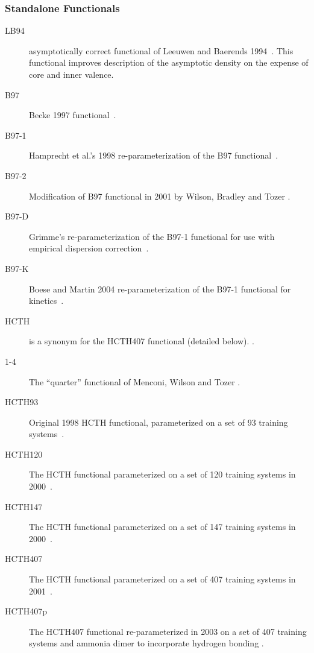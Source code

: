 \subsubsection{Standalone Functionals}
\providecommand\onefn[1]{#1}
\begin{description}

\item[LB94] asymptotically correct functional of Leeuwen and
  Baerends 1994~\cite{dft:lb94}. This functional improves description of the
  asymptotic density on the expense of core and inner valence.

\item[B97] Becke 1997 functional~\cite{dft:b97}.

\item[B97-1] Hamprecht et al.'s 1998 re-parameterization of the 
  B97 functional~\cite{dft:b97-1}.

\item[B97-2] Modification of B97 functional in 2001 by Wilson, Bradley and Tozer 
  \cite{dft:b97-2}.

\item[B97-D] Grimme's re-parameterization of the B97-1 functional for use with 
empirical dispersion correction~\cite{dft:b97-d}.

\item[B97-K] Boese and Martin 2004 re-parameterization of the 
  B97-1 functional for kinetics~\cite{dft:b97-1}.

\item[HCTH] is a synonym for the HCTH407 functional (detailed below).
  \cite{dft:hcth407}.

\item[1-4] The ``quarter'' functional of Menconi, Wilson and Tozer 
  \cite{dft:14}.

\item[HCTH93] Original 1998 HCTH functional, parameterized on a set of 
  93 training systems~\cite{dft:hcth93}.

\item[HCTH120] The HCTH functional parameterized on a set of 120 training systems 
  in 2000~\cite{dft:hcth120}.

\item[HCTH147] The HCTH functional parameterized on a set of 147 training systems 
  in 2000~\cite{dft:hcth120}.

\item[HCTH407] The HCTH functional parameterized on a set of 407 training systems 
  in 2001~\cite{dft:hcth407}.

\item[HCTH407p] The HCTH407 functional re-parameterized in 2003 on a set of 407 
  training systems and ammonia dimer to incorporate hydrogen bonding 
  \cite{dft:hcth407p}.

\end{description}

